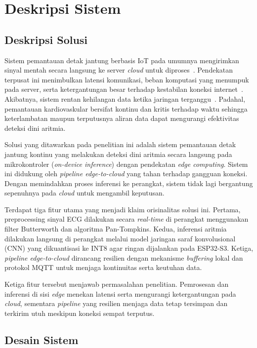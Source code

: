 \chapter{Deskripsi Sistem}

\section{Deskripsi Solusi}

Sistem pemantauan detak jantung berbasis IoT pada umumnya mengirimkan sinyal mentah secara langsung ke server \textit{cloud} untuk diproses~\cite{kim_2023, escobedo_2026}. Pendekatan terpusat ini menimbulkan latensi komunikasi, beban komputasi yang menumpuk pada server, serta ketergantungan besar terhadap kestabilan koneksi internet~\cite{al_quayed_2026, kim_2023}. Akibatnya, sistem rentan kehilangan data ketika jaringan terganggu~\cite{escobedo_2026}. Padahal, pemantauan kardiovaskular bersifat kontinu dan kritis terhadap waktu sehingga keterlambatan maupun terputusnya aliran data dapat mengurangi efektivitas deteksi dini aritmia.

Solusi yang ditawarkan pada penelitian ini adalah sistem pemantauan detak jantung kontinu yang melakukan deteksi dini aritmia secara langsung pada mikrokontroler (\textit{on-device inference}) dengan pendekatan \textit{edge computing}. Sistem ini didukung oleh \textit{pipeline edge-to-cloud} yang tahan terhadap gangguan koneksi. Dengan memindahkan proses inferensi ke perangkat, sistem tidak lagi bergantung sepenuhnya pada \textit{cloud} untuk mengambil keputusan.

Terdapat tiga fitur utama yang menjadi klaim orisinalitas solusi ini. Pertama, preprocessing sinyal ECG dilakukan secara \textit{real-time} di perangkat menggunakan filter Butterworth dan algoritma Pan-Tompkins. Kedua, inferensi aritmia dilakukan langsung di perangkat melalui model jaringan saraf konvolusional (CNN) yang dikuantisasi ke INT8 agar ringan dijalankan pada ESP32-S3. Ketiga, \textit{pipeline edge-to-cloud} dirancang resilien dengan mekanisme \textit{buffering} lokal dan protokol MQTT untuk menjaga kontinuitas serta keutuhan data.

Ketiga fitur tersebut menjawab permasalahan penelitian. Pemrosesan dan inferensi di sisi \textit{edge} menekan latensi serta mengurangi ketergantungan pada \textit{cloud}, sementara \textit{pipeline} yang resilien menjaga data tetap tersimpan dan terkirim utuh meskipun koneksi sempat terputus.

\section{Desain Sistem}


